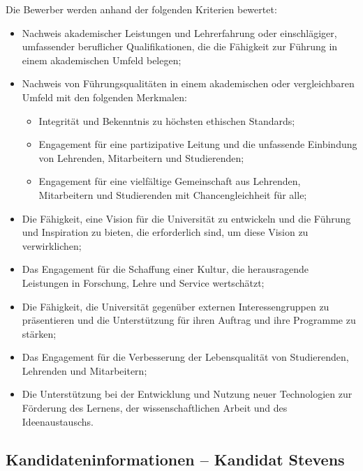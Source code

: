 Die Bewerber werden anhand der folgenden Kriterien bewertet:
\begin{itemize}
  \item Nachweis akademischer Leistungen und Lehrerfahrung oder einschlägiger, umfassender beruflicher
    Qualifikationen, die die Fähigkeit zur Führung in einem akademischen Umfeld belegen;
  \item Nachweis von Führungsqualitäten in einem akademischen oder vergleichbaren Umfeld mit den folgenden Merkmalen:
    \begin{itemize}
      \item Integrität und Bekenntnis zu höchsten ethischen Standards;
      \item Engagement für eine partizipative Leitung und die unfassende Einbindung von Lehrenden,
        Mitarbeitern und Studierenden;
      \item Engagement für eine vielfältige Gemeinschaft aus Lehrenden, Mitarbeitern und Studierenden mit
        Chancengleichheit für alle;
    \end{itemize}
  \item Die Fähigkeit, eine Vision für die Universität zu entwickeln und die Führung und Inspiration zu
    bieten, die erforderlich sind, um diese Vision zu verwirklichen;
  \item Das Engagement für die Schaffung einer Kultur, die herausragende Leistungen in Forschung, Lehre und
    Service wertschätzt;
  \item Die Fähigkeit, die Universität gegenüber externen Interessengruppen zu präsentieren und die
    Unterstützung für ihren Auftrag und ihre Programme zu stärken;
  \item Das Engagement für die Verbesserung der Lebensqualität von Studierenden, Lehrenden und Mitarbeitern;
  \item Die Unterstützung bei der Entwicklung und Nutzung neuer Technologien zur Förderung des Lernens, der
    wissenschaftlichen Arbeit und des Ideenaustauschs.
\end{itemize}

\clearpage
\subsection*{Kandidateninformationen -- Kandidat Stevens}
\pagestyle{empty}
\thispagestyle{empty}

